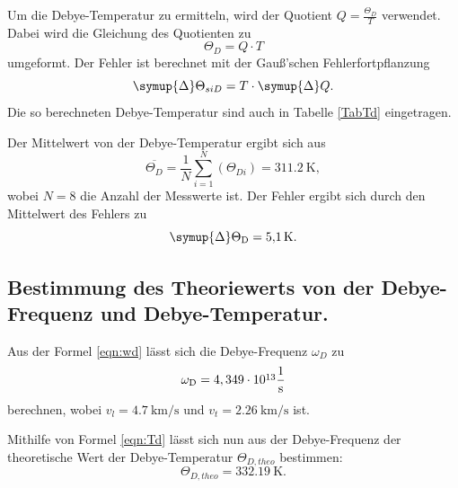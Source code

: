 Um die Debye-Temperatur zu ermitteln, wird der Quotient $Q = \frac{\Theta_{\si{D}}}{T}$ verwendet. Dabei 
wird die Gleichung des Quotienten zu 
\begin{equation*}
    \Theta_{\si{D}} = Q \cdot T
\end{equation*} 
umgeformt. 
Der Fehler ist berechnet mit der Gauß'schen Fehlerfortpflanzung 
\begin{equation}
    \symup{\Delta}\Theta_{si{D}} = T \cdot \symup{\Delta}Q.
\end{equation}
Die so berechneten Debye-Temperatur sind auch in Tabelle \ref{TabTd} eingetragen.

Der Mittelwert von der Debye-Temperatur ergibt sich aus
\begin{equation*}
  \overline{\Theta_{\si{D}}}=  \frac{1}{N} \sum_{i=1}^N (\Theta_{\si{D}i}) = \SI{311,2}{\kelvin},
\end{equation*}
wobei $N=8$ die Anzahl der Messwerte ist. Der Fehler ergibt sich durch den Mittelwert des Fehlers zu 
\begin{equation*}
  \symup{\Delta} \Theta_{\si{D}} = \SI{5,1}{\kelvin}.
\end{equation*}




\subsection{Bestimmung des Theoriewerts von der Debye-Frequenz und Debye-Temperatur.}

Aus der Formel \ref{eqn:wd} lässt sich die Debye-Frequenz $\omega_{\si{D}}$ zu
\begin{equation*}
    \omega_{\si{D}} = 4,349 \cdot \cramped{10^{13}} \frac{1}{\si{s}}
\end{equation*}
berechnen, wobei $v_{\si{l}}=\SI{4,7}{\kilo\metre\per\second}$ und 
$v_{\si{t}}=\SI{2,26}{\kilo\metre\per\second}$ ist.

Mithilfe von Formel \ref{eqn:Td} lässt sich nun aus der Debye-Frequenz der theoretische Wert der 
Debye-Temperatur $\Theta_{\si{D,theo}}$ bestimmen:
\begin{equation*}
    \Theta_{\si{D,theo}} = \SI{332,19}{\kelvin}.
\end{equation*}
 
